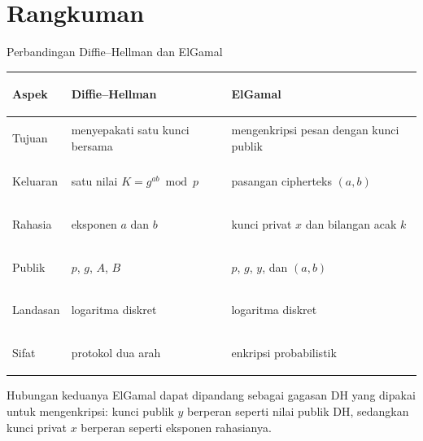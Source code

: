 \documentclass[aspectratio=169,11pt]{beamer}
\begin{document}
\section{Rangkuman}

\begin{frame}{Perbandingan Diffie--Hellman dan ElGamal}
    \footnotesize
    \begin{tabularx}{\linewidth}{@{}>{\bfseries\raggedright\arraybackslash}p{2.3cm}
                                   >{\raggedright\arraybackslash}X
                                   >{\raggedright\arraybackslash}X@{}}
        \toprule
        Aspek & Diffie--Hellman & ElGamal \\
        \midrule
        Tujuan & menyepakati satu kunci bersama & mengenkripsi pesan dengan
        kunci publik \\
        \addlinespace
        Keluaran & satu nilai $K = g^{ab} \bmod p$ & pasangan cipherteks
        $(a,b)$ \\
        \addlinespace
        Rahasia & eksponen $a$ dan $b$ & kunci privat $x$ dan bilangan acak
        $k$ \\
        \addlinespace
        Publik & $p$, $g$, $A$, $B$ & $p$, $g$, $y$, dan $(a,b)$ \\
        \addlinespace
        Landasan & logaritma diskret & logaritma diskret \\
        \addlinespace
        Sifat & protokol dua arah & enkripsi probabilistik \\
        \bottomrule
    \end{tabularx}
    \vspace{0.2cm}
    \begin{exampleblock}{Hubungan keduanya}
        \footnotesize
        ElGamal dapat dipandang sebagai gagasan DH yang dipakai untuk
        mengenkripsi: kunci publik $y$ berperan seperti nilai publik DH,
        sedangkan kunci privat $x$ berperan seperti eksponen rahasianya.
    \end{exampleblock}
\end{frame}
\end{document}
